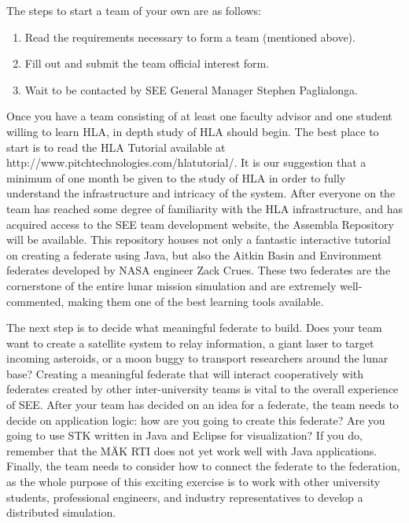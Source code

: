 \documentclass[journal, onecolumn]{IEEEtran}
\begin{document}
The steps to start a team of your own are as follows:
\begin{enumerate}
	\item Read the requirements necessary to form a team (mentioned above).
	\item Fill out and submit the team official interest form.
	\item Wait to be contacted by SEE General Manager Stephen Paglialonga.
\end{enumerate}

Once you have a team consisting of at least one faculty advisor and one student willing to learn HLA, in depth study of HLA should begin.  The best place to start is to read the HLA Tutorial available at http://www.pitchtechnologies.com/hlatutorial/.  It is our suggestion that a minimum of one month be given to the study of HLA in order to fully understand the infrastructure and intricacy of the system.  After everyone on the team has reached some degree of familiarity with the HLA infrastructure, and has acquired access to the SEE team development website, the Assembla Repository will be available.  This repository houses not only a fantastic interactive tutorial on creating a federate using Java, but also the Aitkin Basin and Environment federates developed by NASA engineer Zack Crues.  These two federates are the cornerstone of the entire lunar mission simulation and are extremely well-commented, making them one of the best learning tools available.

The next step is to decide what meaningful federate to build.  Does your team want to create a satellite system to relay information, a giant laser to target incoming asteroids, or a moon buggy to transport researchers around the lunar base?  Creating a meaningful federate that will interact cooperatively with federates created by other inter-university teams is vital to the overall experience of SEE.  After your team has decided on an idea for a federate, the team needs to decide on application logic: how are you going to create this federate?  Are you going to use STK written in Java and Eclipse for visualization?  If you do, remember that the M{\"A}K RTI does not yet work well with Java applications.   Finally, the team needs to consider how to connect the federate to the federation, as the whole purpose of this exciting exercise is to work with other university students, professional engineers, and industry representatives to develop a distributed simulation.
\end{document}
